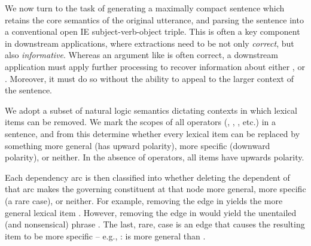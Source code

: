 
We now turn to the task of generating a maximally compact sentence which retains
  the core semantics of the original utterance, and parsing the sentence
  into a conventional open IE subject-verb-object triple.
This is often a key component in downstream applications, where extractions
  need to be not only \textit{correct}, but also \textit{informative}.
Whereas an argument like  is often correct,
  a downstream application must apply further processing to recover information
  about either , or .
Moreover, it must do so without the ability to appeal to the larger context
  of the sentence.

We adopt a subset of natural logic semantics dictating
  contexts in which lexical items can be removed.
We mark the scopes of all operators (, , ,
  etc.) in a sentence, and from this determine whether every lexical item
  can be replaced by something more general (has upward polarity),
  more specific (downward polarity), or neither.
In the absence of operators, all items have upwards polarity.

Each dependency arc is then classified into whether deleting the dependent
  of that arc makes the governing constituent at that node more general,
  more specific (a rare case), or neither.
For example, removing the  edge in \hbox{} yields the
  more general lexical item .
However, removing the  edge in \hbox{} would yield the
  unentailed (and nonsensical) phrase .
The last, rare, case is an edge that causes the resulting item to be 
  more specific -- e.g., : 
  \hbox{} is more general than .

